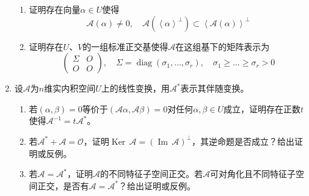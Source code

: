 \documentclass[a4paper,UTF8,fontset=windows,AutoFakeBold]{ctexart}
\DeclareMathOperator{\diag}{diag}
\DeclareMathOperator{\im}{Im\,}
\DeclareMathOperator{\Ker}{Ker\,}
\newcommand*{\ma}{\mathcal{A}}
\newcommand*{\mo}{\mathcal{O}}
\begin{document}
\begin{enumerate}
\begin{enumerate}
        \item 证明存在向量$\alpha\in U$使得
        $$\ma(\alpha)\ne0,\quad\ma(\left<\alpha\right>^\bot)\subset\left<\ma(\alpha)\right>^\bot$$
        \item 证明存在$U$、$V$的一组标准正交基使得$\ma$在这组基下的矩阵表示为
        $$\begin{pmatrix}\Sigma&O\\O&O\end{pmatrix},\quad\Sigma=\diag(\sigma_1,\dots,\sigma_r),\quad\sigma_1\ge\dots\ge\sigma_r>0$$
    \end{enumerate}

    \item
    设$\ma$为$n$维实内积空间$U$上的线性变换，用$\ma^*$表示其伴随变换。
    \begin{enumerate}
        \item 若$(\alpha,\beta)=0$等价于$(\ma\alpha,\ma\beta)=0$对任何$\alpha,\beta\in U$成立，证明存在正数$t$使得$\ma^{-1}=t\ma^*$。
        \item 若$\ma^*+\ma=\mo$，证明$\Ker\ma=(\im\ma)^\bot$，其逆命题是否成立？给出证明或反例。
        \item 若$\ma=\ma^*$，证明$\ma$的不同特征子空间正交。若$\ma$可对角化且不同特征子空间正交，是否有$\ma=\ma^*$？给出证明或反例。
    \end{enumerate}
\end{enumerate}
\end{document}
